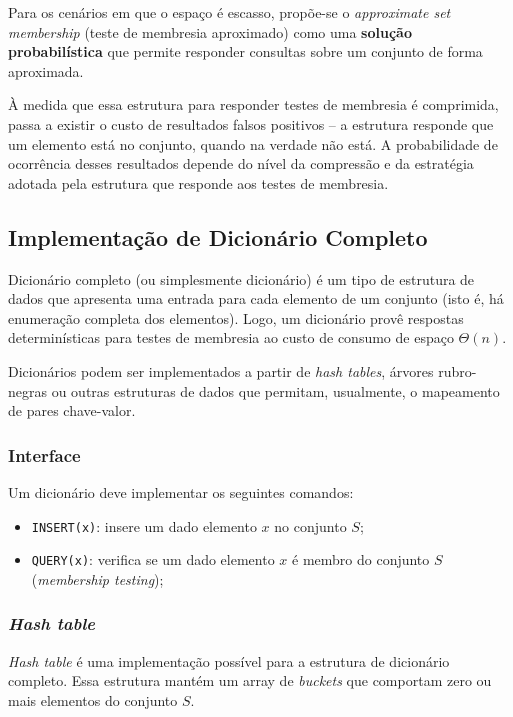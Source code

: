 \documentclass[12pt,twoside,english,brazilian]{article}
\begin{document}
Para os cenários em que o espaço é escasso, propõe-se o \textit{approximate set membership} (teste de membresia aproximado) como uma \textbf{solução probabilística} que permite responder consultas sobre um conjunto de forma aproximada.

À medida que essa estrutura para responder testes de membresia é comprimida, passa a existir o custo de resultados falsos positivos -- a estrutura responde que um elemento está no conjunto, quando na verdade não está. A probabilidade de ocorrência desses resultados depende do nível da compressão e da estratégia adotada pela estrutura que responde aos testes de membresia.

\subsection{Implementação de Dicionário Completo}

Dicionário completo (ou simplesmente dicionário) é um tipo de estrutura de dados que apresenta uma entrada para cada elemento de um conjunto (isto é, há enumeração completa dos elementos). Logo, um dicionário provê respostas determinísticas para testes de membresia ao custo de consumo de espaço $\Theta(n)$.

Dicionários podem ser implementados a partir de \textit{hash tables}, árvores rubro-negras ou outras estruturas de dados que permitam, usualmente, o mapeamento de pares chave-valor.

\subsubsection{Interface}

Um dicionário deve implementar os seguintes comandos:
\begin{itemize}
    \item \texttt{INSERT(x)}: insere um dado elemento $x$ no conjunto $S$;
    \item \texttt{QUERY(x)}: verifica se um dado elemento $x$ é membro do conjunto $S$ (\textit{membership testing});
\end{itemize}

\subsubsection{\textit{Hash table}}

\textit{Hash table} é uma implementação possível para a estrutura de dicionário completo. Essa estrutura mantém um array de \textit{buckets} que comportam zero ou mais elementos do conjunto $S$. 
\end{document}
